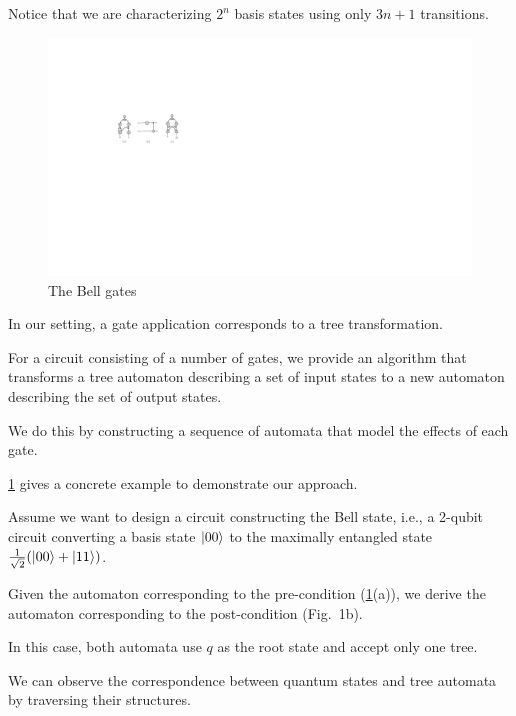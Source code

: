 Notice that we are characterizing $2^n$ basis states using only $3n+1$ transitions.


\begin{figure}
\includegraphics{Figures/Circuits/Bells}
\caption{The Bell gates}
\label{Bells:fig}
\end{figure}

In our setting, a gate application corresponds to a tree transformation.

For a circuit consisting of a number of gates, we provide an algorithm that transforms a tree automaton describing a set of input states to a new automaton describing the set of output states.

We do this by constructing a sequence of automata that model the effects of each gate.

\cref{Bells:fig} gives a concrete example to demonstrate our approach.


Assume we want to design a circuit constructing the Bell state, i.e., a 2-qubit circuit converting a basis state $|00\rangle$ to the maximally entangled state $\frac{1}{\sqrt{2}}(|00\rangle + |11\rangle)$.

Given the automaton corresponding to the pre-condition (\cref{Bells:fig}(a)), we derive the automaton corresponding to the post-condition (Fig.~1b).

In this case, both automata use $q$ as the root state and accept only one tree.

We can observe the correspondence between quantum states and tree automata by traversing their structures.

%

